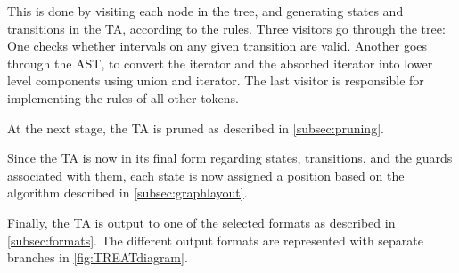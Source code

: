 \vspace{.5\baselineskip plus 2pt}
This is done by visiting each node in the tree, and generating states and transitions in the TA, according to the rules. Three visitors go through the tree: One checks whether intervals on any given transition are valid. Another goes through the AST, to convert the iterator and the absorbed iterator into lower level components using union and iterator. The last visitor is responsible for implementing the rules of all other tokens.

\vspace{.5\baselineskip plus 2pt}
At the next stage, the TA is pruned as described in \cref{subsec:pruning}.

\vspace{.5\baselineskip plus 2pt}
Since the TA is now in its final form regarding states, transitions, and the guards associated with them, each state is now assigned a position based on the algorithm described in \cref{subsec:graphlayout}.

\vspace{.5\baselineskip plus 2pt}
Finally, the TA is output to one of the selected formats as described in \cref{subsec:formats}. The different output formats are represented with separate branches in \cref{fig:TREATdiagram}.
